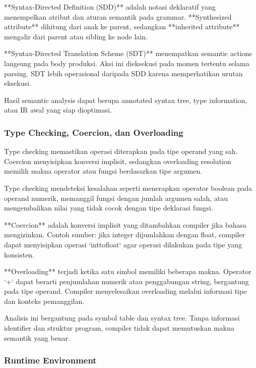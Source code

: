 **Syntax-Directed Definition (SDD)** adalah notasi deklaratif yang menempelkan atribut dan aturan semantik pada grammar. **Synthesized attribute** dihitung dari anak ke parent, sedangkan **inherited attribute** mengalir dari parent atau sibling ke node lain.

**Syntax-Directed Translation Scheme (SDT)** menempatkan semantic actions langsung pada body produksi. Aksi ini dieksekusi pada momen tertentu selama parsing. SDT lebih operasional daripada SDD karena memperhatikan urutan eksekusi.

Hasil semantic analysis dapat berupa annotated syntax tree, type information, atau IR awal yang siap dioptimasi.

\subsubsection{Type Checking, Coercion, dan Overloading}

\begin{jawab}
Type checking memastikan operasi diterapkan pada tipe operand yang sah. Coercion menyisipkan konversi implisit, sedangkan overloading resolution memilih makna operator atau fungsi berdasarkan tipe argumen.
\end{jawab}

Type checking mendeteksi kesalahan seperti menerapkan operator boolean pada operand numerik, memanggil fungsi dengan jumlah argumen salah, atau mengembalikan nilai yang tidak cocok dengan tipe deklarasi fungsi.

**Coercion** adalah konversi implisit yang ditambahkan compiler jika bahasa mengizinkan. Contoh sumber: jika integer dijumlahkan dengan float, compiler dapat menyisipkan operasi `inttofloat` agar operasi dilakukan pada tipe yang konsisten.

**Overloading** terjadi ketika satu simbol memiliki beberapa makna. Operator `+` dapat berarti penjumlahan numerik atau penggabungan string, bergantung pada tipe operand. Compiler menyelesaikan overloading melalui informasi tipe dan konteks pemanggilan.

Analisis ini bergantung pada symbol table dan syntax tree. Tanpa informasi identifier dan struktur program, compiler tidak dapat memutuskan makna semantik yang benar.

\subsubsection{Runtime Environment}

